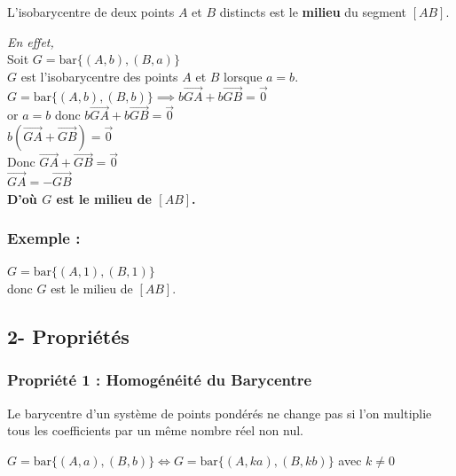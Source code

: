\documentclass{article}
\begin{document}
L'isobarycentre de deux points $A$ et $B$ distincts est le \textbf{milieu} du segment $[AB]$.

\vspace{1em}

\noindent \textit{En effet,} \\
Soit $G = \text{bar} \{(A, b), (B, a)\}$ \\
$G$ est l'isobarycentre des points $A$ et $B$ lorsque $a = b$. \\
$G = \text{bar} \{(A, b), (B, b)\} \implies b \overrightarrow{GA} + b \overrightarrow{GB} = \vec{0}$ \\
 or $a = b$ donc $b \overrightarrow{GA} + b \overrightarrow{GB} = \vec{0}$ \\
 $b (\overrightarrow{GA} + \overrightarrow{GB}) = \vec{0}$ \\
 Donc $\overrightarrow{GA} + \overrightarrow{GB} = \vec{0}$ \\
 $\overrightarrow{GA} = -\overrightarrow{GB}$ \\
\textbf{D'où $G$ est le milieu de $[AB]$.}

\subsubsection*{Exemple :}

$G = \text{bar} \{(A, 1), (B, 1)\}$ \\
donc $G$ est le milieu de $[AB]$.

\vspace{2em}

\subsection*{2- Propriétés}

\subsubsection*{Propriété 1 : Homogénéité du Barycentre}

Le barycentre d'un système de points pondérés ne change pas si l'on multiplie tous les coefficients par un même nombre réel non nul.

\vspace{1em}

$G = \text{bar} \{(A, a), (B, b)\} \iff G = \text{bar} \{(A, ka), (B, kb)\}$ avec $k \neq 0$
\end{document}
